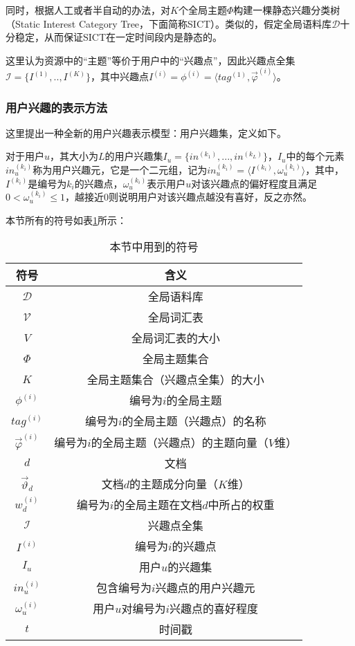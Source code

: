 同时，根据人工或者半自动的办法，对$K$个全局主题$\Phi$构建一棵静态兴趣分类树（Static Interest Category Tree，下面简称SICT）。类似的，假定全局语料库$\mathcal{D}$十分稳定，从而保证SICT在一定时间段内是静态的。

这里认为资源中的“主题”等价于用户中的“兴趣点”，因此兴趣点全集$\mathcal{I}=\{I^{(1)},..,I^{(K)}\}$，其中兴趣点$I^{(i)}=\phi^{(i)}=\langle tag^{(1)},\vec{\varphi}^{(i)}\rangle$。

\subsubsection{用户兴趣的表示方法}
这里提出一种全新的用户兴趣表示模型：用户兴趣集，定义如下。

对于用户$u$，其大小为$L$的用户兴趣集$I_u=\{in^{(k_1)},...,in^{(k_L)}\}$，$I_u$中的每个元素$in_u^{(k_i)}$称为用户兴趣元，它是一个二元组，记为$in_u^{(k_i)}=\langle I^{(k_i)},\omega_u^{(k_i)} \rangle$，其中，$I^{(k_i)}$是编号为$k_i$的兴趣点，$\omega_u^{(k_i)}$表示用户$u$对该兴趣点的偏好程度且满足$0< \omega_u^{(k_i)}\le 1$，越接近0则说明用户对该兴趣点越没有喜好，反之亦然。

本节所有的符号如表\ref{tbl:notation2}所示：
\begin{table}[ht]
\caption{本节中用到的符号}
\centering
\begin{tabular}{c c} 
\hline
符号 & 含义 \\ 
\hline
$\mathcal{D}$ & 全局语料库 \\
$\mathcal{V}$ & 全局词汇表 \\
$V$ & 全局词汇表的大小 \\
$\Phi$ & 全局主题集合 \\
$K$ & 全局主题集合（兴趣点全集）的大小 \\
$\phi^{(i)}$ & 编号为$i$的全局主题 \\
$tag^{(i)}$ & 编号为$i$的全局主题（兴趣点）的名称 \\
$\vec{\varphi}^{(i)}$ & 编号为$i$的全局主题（兴趣点）的主题向量（$V$维） \\
$d$ & 文档 \\
$\vec{\vartheta}_d$ & 文档$d$的主题成分向量（$K$维） \\
$w_d^{(i)}$ & 编号为$i$的全局主题在文档$d$中所占的权重 \\
$\mathcal{I}$ & 兴趣点全集 \\
$I^{(i)}$ & 编号为$i$的兴趣点 \\
$I_u$ & 用户$u$的兴趣集 \\
$in_u^{(i)}$ & 包含编号为$i$兴趣点的用户兴趣元 \\
$\omega_u^{(i)}$ & 用户$u$对编号为$i$兴趣点的喜好程度 \\
$t$ & 时间戳 \\
\hline
\end{tabular}
\label{tbl:notation2}
\end{table}

